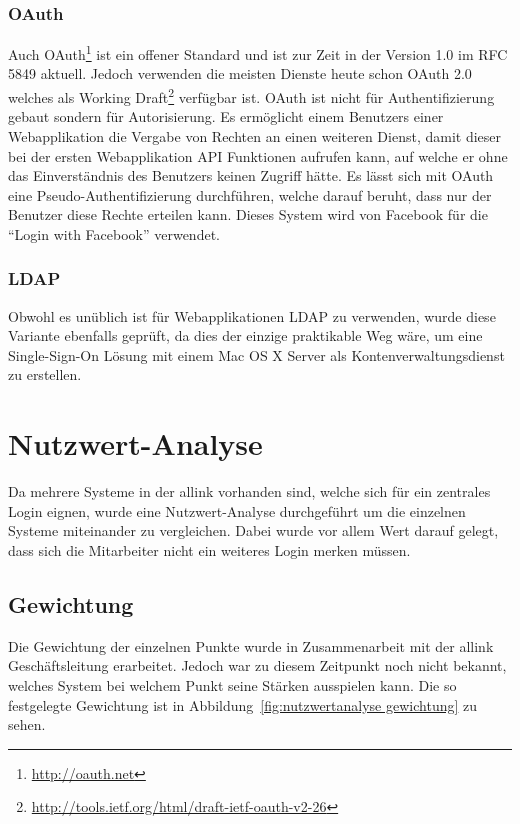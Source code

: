 \subsubsection{OAuth}
\label{ssub:OAuth}
Auch OAuth\footnote{\url{http://oauth.net}} ist ein offener Standard und ist zur Zeit in der Version 1.0 im RFC 5849\cite{rfc5849} aktuell. Jedoch verwenden die meisten Dienste heute schon OAuth 2.0 welches als Working Draft\footnote{\url{http://tools.ietf.org/html/draft-ietf-oauth-v2-26}} verfügbar ist. OAuth ist nicht für Authentifizierung gebaut sondern für Autorisierung. Es ermöglicht einem Benutzers einer Webapplikation die Vergabe von Rechten an einen weiteren Dienst, damit dieser bei der ersten Webapplikation API Funktionen aufrufen kann, auf welche er ohne das Einverständnis des Benutzers keinen Zugriff hätte. Es lässt sich mit OAuth eine Pseudo-Authentifizierung durchführen, welche darauf beruht, dass nur der Benutzer diese Rechte erteilen kann. Dieses System wird von Facebook für die ``Login with Facebook'' verwendet.

\subsubsection{LDAP}
\label{ssub:LDAP}
Obwohl es unüblich ist für Webapplikationen LDAP\cite{rfc4511} zu verwenden, wurde diese Variante ebenfalls geprüft, da dies der einzige praktikable Weg wäre, um eine Single-Sign-On Lösung mit einem Mac OS X Server als Kontenverwaltungsdienst zu erstellen.

\section{Nutzwert-Analyse}
\label{sec:Nutzwert-Analyse}
Da mehrere Systeme in der allink vorhanden sind, welche sich für ein zentrales Login eignen, wurde eine Nutzwert-Analyse durchgeführt um die einzelnen Systeme miteinander zu vergleichen. Dabei wurde vor allem Wert darauf gelegt, dass sich die Mitarbeiter nicht ein weiteres Login merken müssen.

\subsection{Gewichtung}
\label{sub:Gewichtung}
Die Gewichtung der einzelnen Punkte wurde in Zusammenarbeit mit der allink Geschäftsleitung erarbeitet. Jedoch war zu diesem Zeitpunkt noch nicht bekannt, welches System bei welchem Punkt seine Stärken ausspielen kann. Die so festgelegte Gewichtung ist in Abbildung~\ref{fig:nutzwertanalyse gewichtung} zu sehen.

